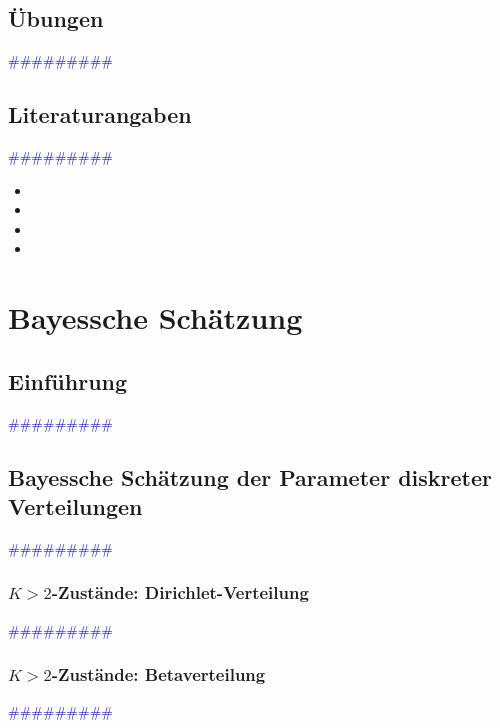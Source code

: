 \documentclass{article}
\begin{document}
  \subsection{Übungen} %
      \textcolor{blue}{\#\#\#\#\#\#\#\#\#}
  \subsection{Literaturangaben} %
      \textcolor{blue}{\#\#\#\#\#\#\#\#\#}

      \begin{itemize}
      \color{red}
        \item 
        \item
      \color{ForestGreen}
        \item 
        \item
      \end{itemize}




\newpage
\section{Bayessche Schätzung} %
  \subsection{Einführung} %
      \textcolor{blue}{\#\#\#\#\#\#\#\#\#}
  \subsection{Bayessche Schätzung der Parameter diskreter Verteilungen} %
      \textcolor{blue}{\#\#\#\#\#\#\#\#\#}
    \subsubsection{$K>2$-Zustände: Dirichlet-Verteilung} %
      \textcolor{blue}{\#\#\#\#\#\#\#\#\#}
    \subsubsection{$K>2$-Zustände: Betaverteilung} %
      \textcolor{blue}{\#\#\#\#\#\#\#\#\#}
\end{document}
